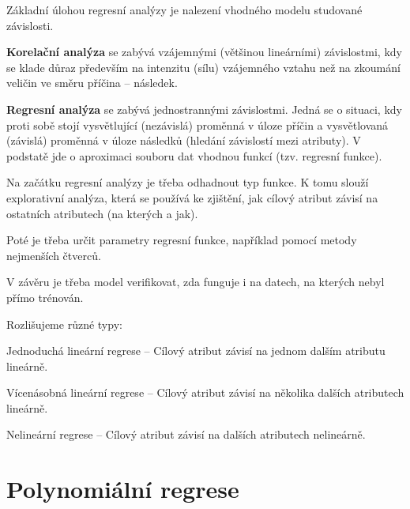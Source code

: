 \begin{compactitem}
    \item Základní úlohou regresní analýzy je nalezení vhodného modelu studované závislosti.

    \item \textbf{Korelační analýza} se zabývá vzájemnými (většinou lineárními) závislostmi, kdy se klade důraz především na intenzitu (sílu) vzájemného vztahu než na zkoumání veličin ve směru příčina -- následek.

    \item \textbf{Regresní analýza} se zabývá jednostrannými závislostmi. Jedná se o situaci, kdy proti sobě stojí vysvětlující (nezávislá) proměnná v úloze příčin a vysvětlovaná (závislá) proměnná v úloze následků (hledání závislostí mezi atributy). V podstatě jde o aproximaci souboru dat vhodnou funkcí (tzv. regresní funkce). \begin{compactitem}
        \item Na začátku regresní analýzy je třeba odhadnout typ funkce. K tomu slouží explorativní analýza, která se používá ke zjištění, jak cílový atribut závisí na ostatních atributech (na kterých a jak).
        \item Poté je třeba určit parametry regresní funkce, například pomocí metody nejmenších čtverců.
        \item V závěru je třeba model verifikovat, zda funguje i na datech, na kterých nebyl přímo trénován.
    \end{compactitem}

    \item Rozlišujeme různé typy: \begin{compactitem}
        \item Jednoduchá lineární regrese -- Cílový atribut závisí na jednom dalším atributu lineárně.
        \item Vícenásobná lineární regrese -- Cílový atribut závisí na několika dalších atributech lineárně.
        \item Nelineární regrese -- Cílový atribut závisí na dalších atributech nelineárně.
    \end{compactitem}

\end{compactitem}


\section{Polynomiální regrese}

